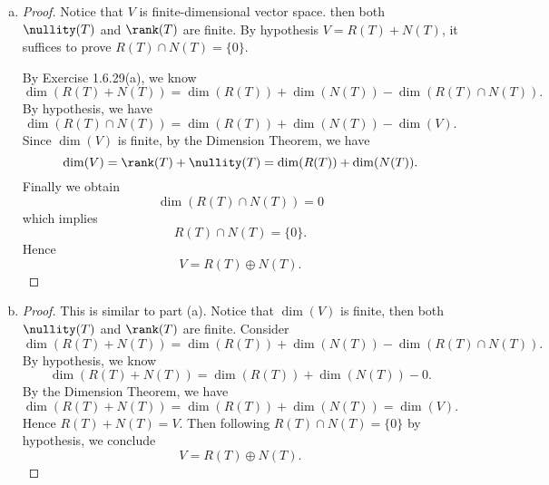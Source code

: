 \begin{Exercise}
\begin{enumerate}[(a)]
\item
\begin{proof}
Notice that $V$ is finite-dimensional vector space. then both $\nullity(T)$ and $\rank(T)$ are finite. By hypothesis $V=R(T)+N(T)$, it suffices to prove $R(T)\cap N(T) = \{0\}$.

By Exercise 1.6.29(a), we know 
$$
\dim(R(T)+N(T)) = \dim(R(T))+\dim(N(T))-\dim(R(T)\cap N(T)).
$$
By hypothesis, we have
$$
\dim(R(T)\cap N(T)) = \dim(R(T))+\dim(N(T))-\dim(V).
$$
Since $\dim(V)$ is finite, by the Dimension Theorem, we have
$$
\dim(V) = \rank(T)+ \nullity(T) = \dim(R(T))+\dim(N(T)).
$$
Finally we obtain
$$
\dim(R(T)\cap N(T)) = 0
$$
which implies
$$
R(T)\cap N(T) = \{0\}.
$$
Hence
$$
V = R(T)\oplus N(T).
$$
\end{proof}

\item
\begin{proof}
This is similar to part (a). Notice that $\dim(V)$ is finite, then both $\nullity(T)$ and $\rank(T)$ are finite. Consider
$$
\dim(R(T)+N(T)) = \dim(R(T))+\dim(N(T))-\dim(R(T)\cap N(T)).
$$
By hypothesis, we know
$$
\dim(R(T)+N(T)) = \dim(R(T))+\dim(N(T))-0.
$$
By the Dimension Theorem, we have
$$
\dim(R(T)+N(T)) = \dim(R(T))+\dim(N(T)) = \dim(V).
$$
Hence $R(T)+N(T) = V$. Then following $R(T)\cap N(T) = \{0\}$ by hypothesis, we conclude
$$
V = R(T)\oplus N(T).
$$
\end{proof}
\end{enumerate}
\end{Exercise}